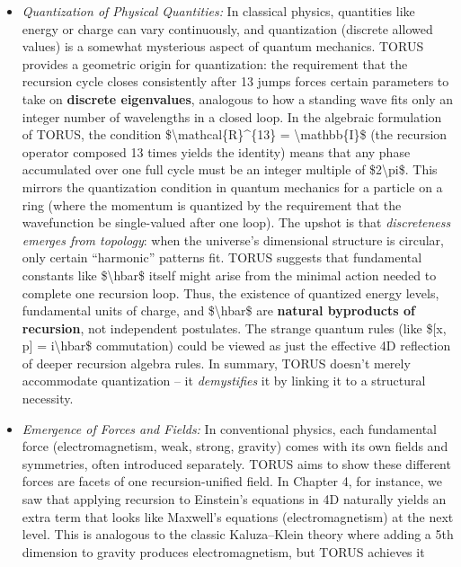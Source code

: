\documentclass[]{article}
\begin{document}
\begin{itemize}
\item
  \emph{Quantization of Physical Quantities:} In classical physics,
  quantities like energy or charge can vary continuously, and
  quantization (discrete allowed values) is a somewhat mysterious aspect
  of quantum mechanics. TORUS provides a geometric origin for
  quantization: the requirement that the recursion cycle closes
  consistently after 13 jumps forces certain parameters to take on
  \textbf{discrete eigenvalues}, analogous to how a standing wave fits
  only an integer number of wavelengths in a closed loop​. In the
  algebraic formulation of TORUS, the condition
  \$\textbackslash{}mathcal\{R\}\^{}\{13\} =
  \textbackslash{}mathbb\{I\}\$ (the recursion operator composed 13
  times yields the identity) means that any phase accumulated over one
  full cycle must be an integer multiple of \$2\textbackslash{}pi\$​.
  This mirrors the quantization condition in quantum mechanics for a
  particle on a ring (where the momentum is quantized by the requirement
  that the wavefunction be single-valued after one loop)​. The upshot is
  that \emph{discreteness emerges from topology}: when the universe's
  dimensional structure is circular, only certain ``harmonic'' patterns
  fit. TORUS suggests that fundamental constants like
  \$\textbackslash{}hbar\$ itself might arise from the minimal action
  needed to complete one recursion loop​. Thus, the existence of
  quantized energy levels, fundamental units of charge, and
  \$\textbackslash{}hbar\$ are \textbf{natural byproducts of recursion},
  not independent postulates​. The strange quantum rules (like \${[}x,
  p{]} = i\textbackslash{}hbar\$ commutation) could be viewed as just
  the effective 4D reflection of deeper recursion algebra rules​. In
  summary, TORUS doesn't merely accommodate quantization -- it
  \emph{demystifies} it by linking it to a structural necessity.
\item
  \emph{Emergence of Forces and Fields:} In conventional physics, each
  fundamental force (electromagnetism, weak, strong, gravity) comes with
  its own fields and symmetries, often introduced separately. TORUS aims
  to show these different forces are facets of one recursion-unified
  field. In Chapter 4, for instance, we saw that applying recursion to
  Einstein's equations in 4D naturally yields an extra term that looks
  like Maxwell's equations (electromagnetism) at the next level​. This
  is analogous to the classic Kaluza--Klein theory where adding a 5th
  dimension to gravity produces electromagnetism, but TORUS achieves it

\end{itemize}
\end{document}
